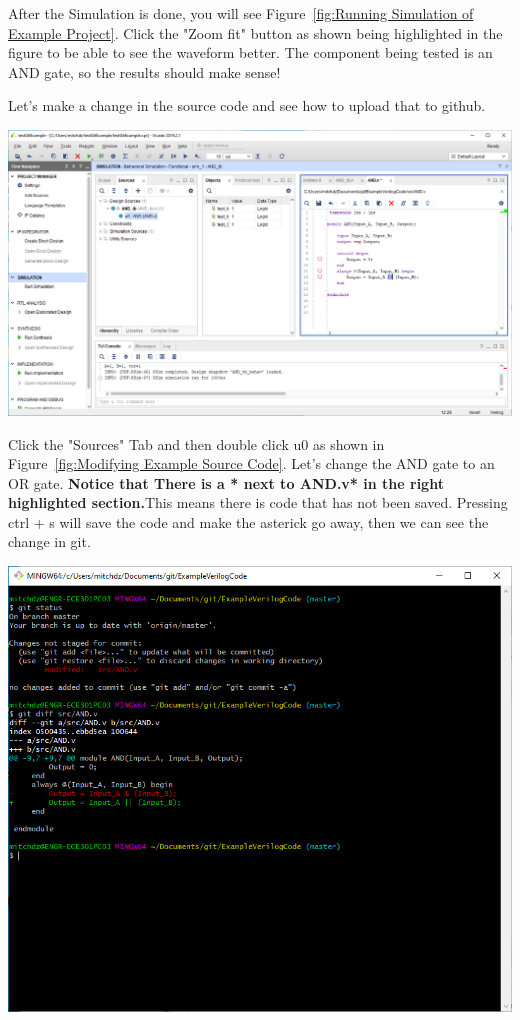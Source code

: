 \documentclass[12pt]{article}
\begin{document}
After the Simulation is done, you will see Figure~\ref{fig:Running Simulation of Example Project}. Click the "Zoom fit" button as shown being highlighted in the figure to be able to see the waveform better. The component being tested is an AND gate, so the results should make sense!

Let's make a change in the source code and see how to upload that to github.

\begin{center}
    \includegraphics[scale=0.4]{viv_07.PNG}
    \label{fig:Modifying Example Source Code}
\end{center}

Click the "Sources" Tab and then double click u0 as shown in Figure~\ref{fig:Modifying Example Source Code}. Let's change the AND gate to an OR gate. \textbf{Notice that There is a * next to AND.v* in the right highlighted section.}This means there is code that has not been saved. Pressing ctrl + s will save the code and make the asterick go away, then we can see the change in git.

\begin{center}
    \includegraphics[scale=0.8]{viv_08.PNG}
    \label{fig:Viewing Modified Source Code in Git}
\end{center}
\end{document}
